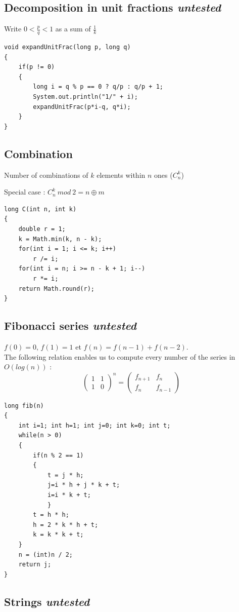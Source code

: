 \subsection{Decomposition in unit fractions {\footnotesize \textit{untested}}}
Write $0<\frac{p}{q}<1$ as a sum of $\frac{1}{k}$
\begin{lstlisting}
void expandUnitFrac(long p, long q)
{
	if(p != 0)
	{
		long i = q % p == 0 ? q/p : q/p + 1;
		System.out.println("1/" + i);
		expandUnitFrac(p*i-q, q*i);
	}
}
\end{lstlisting}
\subsection{Combination}
Number of combinations of $k$ elements within $n$ ones ($C^k_n$)

Special case : $C^k_n\ mod\ 2 = n\oplus m$
\begin{lstlisting}
long C(int n, int k)
{
	double r = 1;
	k = Math.min(k, n - k);
	for(int i = 1; i <= k; i++)
		r /= i;
	for(int i = n; i >= n - k + 1; i--)
		r *= i;
	return Math.round(r);
}
\end{lstlisting}
\subsection{Fibonacci series {\footnotesize \textit{untested}}}
$f(0) = 0$, $f(1) = 1$ et $f(n) = f(n - 1) + f(n - 2)$.\\
The following relation enables us to compute every number of the series in $O(log(n))$ :\\
$$\begin{pmatrix}
1 & 1\\
1 & 0
\end{pmatrix}^n=\begin{pmatrix}
f_{n+1} & f_n\\
f_n & f_{n-1}
\end{pmatrix}$$
\begin{lstlisting}
long fib(n)
{
	int i=1; int h=1; int j=0; int k=0; int t;
	while(n > 0)
	{
		if(n % 2 == 1)
		{
			t = j * h;
			j=i * h + j * k + t; 
			i=i * k + t;
    		}
   		t = h * h;
   		h = 2 * k * h + t;
   		k = k * k + t;
	}
	n = (int)n / 2; 
	return j;
}
\end{lstlisting}

\subsection{Strings {\footnotesize \textit{untested}}}
\begin{lstlisting}

\end{lstlisting}
